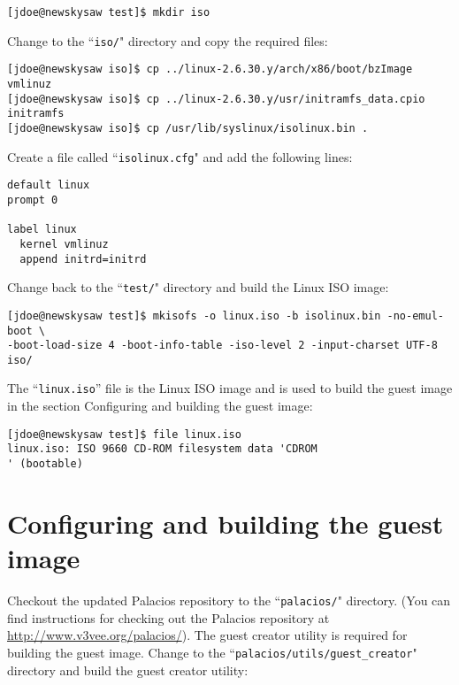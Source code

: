 \documentclass{article}[11pt]
\begin{document}
\begin{verbatim}
[jdoe@newskysaw test]$ mkdir iso
\end{verbatim}

\noindent
Change to the ``\verb|iso/|" directory and copy the required files:

\begin{verbatim}
[jdoe@newskysaw iso]$ cp ../linux-2.6.30.y/arch/x86/boot/bzImage vmlinuz
[jdoe@newskysaw iso]$ cp ../linux-2.6.30.y/usr/initramfs_data.cpio initramfs
[jdoe@newskysaw iso]$ cp /usr/lib/syslinux/isolinux.bin .
\end{verbatim}

\noindent
Create a file called ``\verb|isolinux.cfg|" and add the following lines:

\begin{verbatim}
default linux
prompt 0

label linux
  kernel vmlinuz
  append initrd=initrd
\end{verbatim}

\noindent
Change back to the ``\verb|test/|" directory and build the Linux ISO image:

\begin{verbatim}
[jdoe@newskysaw test]$ mkisofs -o linux.iso -b isolinux.bin -no-emul-boot \
-boot-load-size 4 -boot-info-table -iso-level 2 -input-charset UTF-8 iso/
\end{verbatim}

\noindent
The ``\verb|linux.iso|'' file is the Linux ISO image and is used to build the
guest image in the section Configuring and building the guest image:

\begin{verbatim}
[jdoe@newskysaw test]$ file linux.iso
linux.iso: ISO 9660 CD-ROM filesystem data 'CDROM                          ' (bootable)
\end{verbatim}


\section{Configuring and building the guest image}

Checkout the updated Palacios repository to the ``\verb|palacios/|" directory.
(You can find instructions for checking out the Palacios repository at
\url{http://www.v3vee.org/palacios/}). The guest creator utility is required for
building the guest image. Change to the ``\verb|palacios/utils/guest_creator|"
directory and build the guest creator utility:
\end{document}
